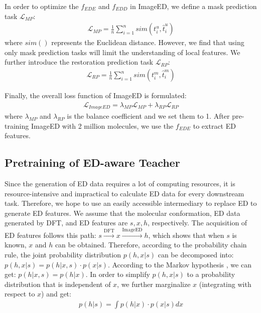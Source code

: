 \documentclass{article}
\begin{document}
In order to optimize the $f_{EDE}$ and $f_{EDD}$ in ImageED, we define a mask prediction task $\mathcal{L}_{MP}$:
\begin{align}
\label{Formula_L_MP}
\mathcal{L}_{MP}=\frac{1}{n}\sum_{i=1}^n sim(t^u_i, \hat{t}^u_i)
\end{align}
where $sim()$ represents the Euclidean distance. However, we find that using only mask prediction tasks will limit the understanding of local features. We further introduce the restoration prediction task $\mathcal{L}_{RP}$:
\begin{align}
\label{Formula_L_RP}
\mathcal{L}_{RP}=\frac{1}{n}\sum_{i=1}^n sim(t^m_i, \hat{t}^m_i)
\end{align}

Finally, the overall loss function of ImageED is formulated:
\begin{align}
\label{Formula_L_ImageED}
\mathcal{L}_{ImageED}=\lambda_{MP}\mathcal{L}_{MP}+\lambda_{RP}\mathcal{L}_{RP}
\end{align}
where $\lambda_{MP}$ and $\lambda_{RP}$ is the balance coefficient and we set them to 1. After pre-training ImageED with 2 million molecules, we use the $f_{EDE}$ to extract ED features.


\subsection{Pretraining of ED-aware Teacher}
\label{sec:Pretraining_of_ED-aware_Teacher}

Since the generation of ED data requires a lot of computing resources, it is resource-intensive and impractical to calculate ED data for every downstream task. Therefore, we hope to use an easily accessible intermediary to replace ED to generate ED features. We assume that the molecular conformation, ED data generated by DFT, and ED features are $s, x, h$, respectively. The acquisition of ED features follows this path: $s\xrightarrow{\text{DFT}}x\xrightarrow{\text{ImageED}}h$, which shows that when $s$ is known, $x$ and $h$ can be obtained. Therefore, according to the probability chain rule, the joint probability distribution $p(h,x|s)$ can be decomposed into: $p(h,x|s)=p(h|x,s)\cdot p(x|s)$. According to the Markov hypothesis \cite{markov1960theory}, we can get: $p(h|x,s)=p(h|x)$. In order to simplify $p(h,x|s)$ to a probability distribution that is independent of $x$, we further marginalize $x$ (integrating with respect to $x$) and get:
\begin{align}
\label{Formula_p_h_s}
p(h|s)=\int p(h|x)\cdot p(x|s) dx
\end{align}
\end{document}
